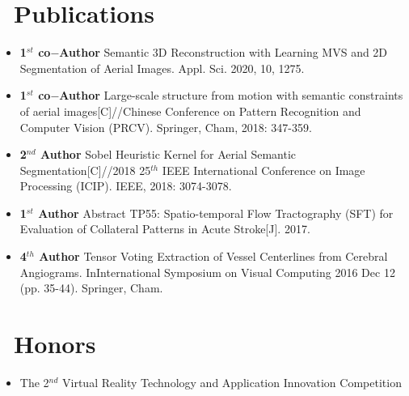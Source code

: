 \documentclass{resume}
\begin{document}
\section{\faBookmark\ Publications}
\begin{itemize} \small
    \item \textbf{1$^{st}$ co$-$Author} Semantic 3D Reconstruction with Learning MVS and 2D Segmentation of Aerial Images. Appl. Sci. 2020, 10, 1275. 
    \item \textbf{1$^{st}$ co$-$Author} Large-scale structure from motion with semantic constraints of aerial images[C]//Chinese Conference on Pattern Recognition and Computer Vision (PRCV). Springer, Cham, 2018: 347-359.
	\item \textbf{2$^{nd}$ Author} Sobel Heuristic Kernel for Aerial Semantic Segmentation[C]//2018 25$^{th}$ IEEE International Conference on Image Processing (ICIP). IEEE, 2018: 3074-3078.
	\item \textbf{1$^{st}$ Author} Abstract TP55: Spatio-temporal Flow Tractography (SFT) for Evaluation of Collateral Patterns in Acute Stroke[J]. 2017.
	\item \textbf{4$^{th}$ Author} Tensor Voting Extraction of Vessel Centerlines from Cerebral Angiograms. InInternational Symposium on Visual Computing 2016 Dec 12 (pp. 35-44). Springer, Cham.
\end{itemize}


\section{\faHeartO\ Honors}

\begin{itemize}
	\item The 2$^{nd}$ Virtual Reality Technology and Application Innovation Competition
\end{itemize}

\end{document}
